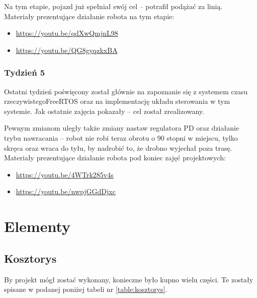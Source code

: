 \documentclass[11pt]{article}
\begin{document}
Na tym etapie, pojazd już spełniał swój cel -- potrafił podążać za linią.\\

Materiały prezentujące działanie robota na tym etapie:
\begin{itemize}
\item \href{https://youtu.be/qdXwQmjnL98}{https://youtu.be/qdXwQmjnL98}
\item \href{https://youtu.be/QG8gyqzkxBA}{https://youtu.be/QG8gyqzkxBA}
\end{itemize}

\subsubsection*{Tydzień 5}

Ostatni tydzień poświęcony został głównie na zapoznanie się z systemem czasu rzeczywistego\linebreak FreeRTOS oraz na implementację układu sterowania w tym systemie. Jak ostatnie zajęcia pokazały -- cel został zrealizowany.

Pewnym zmianom uległy także zmiany nastaw regulatora PD oraz działanie trybu nawracania -- robot nie robi teraz obrotu o 90 stopni w miejscu, tylko skręca oraz wraca do tyłu, by nadrobić to, że drobno wyjechał poza trasę.\\

Materiały prezentujące działanie robota pod koniec zajęć projektowych:
\begin{itemize}
\item \href{https://youtu.be/4WTrk285v4s}{https://youtu.be/4WTrk285v4s}
\item \href{https://youtu.be/nwpjGGdDjxc}{https://youtu.be/nwpjGGdDjxc}
\end{itemize}

\newpage

\section{Elementy}

\subsection{Kosztorys}

By projekt mógł zostać wykonany, konieczne było kupno wielu części.
Te zostały spisane w podanej poniżej tabeli nr \ref{table:kosztorys}.
\end{document}
